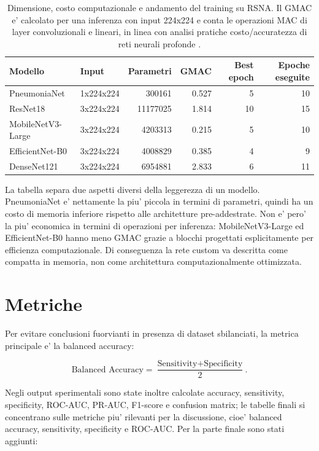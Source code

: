 \documentclass[11pt,a4paper]{article}
\newcommand{\balacc}{balanced accuracy}
\begin{document}
\begin{table}[H]
\centering
\caption{Dimensione, costo computazionale e andamento del training su RSNA. Il GMAC e' calcolato per una inferenza con input 224x224 e conta le operazioni MAC di layer convoluzionali e lineari, in linea con analisi pratiche costo/accuratezza di reti neurali profonde \cite{canziani2016analysis}.}
\begin{tabular}{llrrrr}
\toprule
Modello & Input & Parametri & GMAC & Best epoch & Epoche eseguite \\
\midrule
PneumoniaNet & 1x224x224 & 300161 & 0.527 & 5 & 10 \\
ResNet18 & 3x224x224 & 11177025 & 1.814 & 10 & 15 \\
MobileNetV3-Large & 3x224x224 & 4203313 & 0.215 & 5 & 10 \\
EfficientNet-B0 & 3x224x224 & 4008829 & 0.385 & 4 & 9 \\
DenseNet121 & 3x224x224 & 6954881 & 2.833 & 6 & 11 \\
\bottomrule
\end{tabular}
\end{table}

La tabella separa due aspetti diversi della leggerezza di un modello.
PneumoniaNet e' nettamente la piu' piccola in termini di parametri, quindi ha
un costo di memoria inferiore rispetto alle architetture pre-addestrate. Non e'
pero' la piu' economica in termini di operazioni per inferenza: MobileNetV3-Large
ed EfficientNet-B0 hanno meno GMAC grazie a blocchi progettati esplicitamente
per efficienza computazionale. Di conseguenza la rete custom va descritta come
compatta in memoria, non come architettura computazionalmente ottimizzata.

\section{Metriche}

Per evitare conclusioni fuorvianti in presenza di dataset sbilanciati, la
metrica principale e' la \balacc:

\[
\text{Balanced Accuracy} =
\frac{\text{Sensitivity} + \text{Specificity}}{2}.
\]

Negli output sperimentali sono state inoltre calcolate accuracy, sensitivity,
specificity, ROC-AUC, PR-AUC, F1-score e confusion matrix; le tabelle finali si
concentrano sulle metriche piu' rilevanti per la discussione, cioe' \balacc{},
sensitivity, specificity e ROC-AUC. Per la parte finale sono stati aggiunti:
\end{document}
